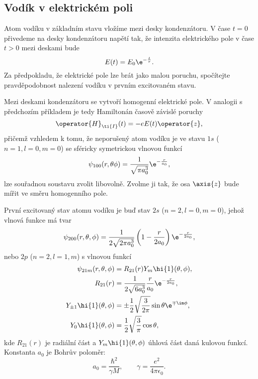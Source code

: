 \subsection{Vodík v elektrickém poli}
Atom vodíku v základním stavu vložíme mezi desky kondenzátoru.
V čase $t=0$ přivedeme na desky kondenzátoru napětí tak, že intenzita elektrického pole v čase $t>0$ mezi deskami bude
\begin{equation}
    E(t)=E_0\e^{-\frac{t}{\tau}}.
\end{equation}
Za předpokladu, že elektrické pole lze brát jako malou poruchu, spočítejte pravděpodobnost nalezení vodíku v prvním excitovaném stavu.
	
\begin{solution}
    Mezi deskami kondenzátoru se vytvoří homogenní elektrické pole.
    V analogii s předchozím příkladem je tedy Hamiltonán časově závislé poruchy 
    \begin{equation}
        \operator{H}_{\ti{I}}(t)=-eE(t)\operator{z},
    \end{equation}
    přičemž vzhledem k tomu, že neporušený atom vodíku je ve stavu $1s$ ($n=1, l=0, m=0$) se sféricky symetrickou vlnovou funkcí
    \begin{equation}
        \psi_{100}(r,\theta\phi)=\frac{1}{\sqrt{\pi a_{0}^{3}}}\e^{-\frac{r}{a_{0}}},
    \end{equation}
    lze souřadnou soustavu zvolit libovolně.
    Zvolme ji tak, že osa $\axis{z}$ bude mířit ve směru homogenního pole.

    První excitovaný stav atomu vodíku je buď stav $2s$ ($n=2, l=0, m=0$), jehož vlnová funkce má tvar
    \begin{equation}
        \psi_{200}(r,\theta,\phi)=\frac{1}{2\sqrt{2\pi a_{0}^{3}}}\left(1-\frac{r}{2a_{0}}\right)\e^{-\frac{r}{2a_{0}}},
    \end{equation}
    nebo $2p$ ($n=2, l=1, m$) s vlnovou funkcí
    \begin{subequations}
        \begin{align}
            \psi_{21m}(r,\theta,\phi)&=R_{21}(r)Y_{m}\hi{1}(\theta,\phi),\\
            R_{21}(r)&=\frac{1}{2\sqrt{6a_{0}^{3}}}\frac{r}{a_{0}}\e^{-\frac{r}{2a_{0}}},\\
            Y_{\pm1}\hi{1}(\theta,\phi)&=\pm\frac{1}{2}\sqrt{\frac{3}{2\pi}}\sin{\theta}\e^{\mp\im\phi},\\
            Y_{0}\hi{1}(\theta,\phi)&=\frac{1}{2}\sqrt{\frac{3}{\pi}}\cos{\theta},
        \end{align}            
    \end{subequations}
    kde $R_{21}(r)$ je radiální část a $Y_{m}\hi{1}(\theta,\phi)$ úhlová část daná kulovou funkcí.
    Konstanta $a_{0}$ je Bohrův poloměr:
    \begin{equation}
        a_{0}=\frac{\hbar^{2}}{\gamma M},\qquad \gamma=\frac{e^{2}}{4\pi\epsilon_{0}}.
    \end{equation}


\end{solution}
